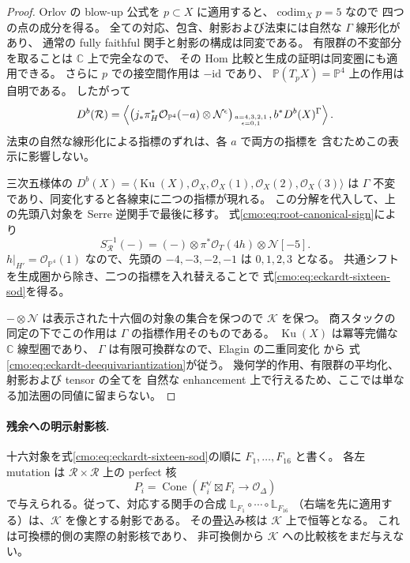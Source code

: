 \begin{proof}
Orlov の blow-up 公式\cite[Theorem~4.3]{CMOOrlovBlowup}を
$p\subset X$ に適用すると、$\operatorname{codim}_Xp=5$ なので
四つの点の成分を得る。
全ての対応、包含、射影および法束には自然な $\Gamma$ 線形化があり、
通常の fully faithful 関手と射影の構成は同変である。
有限群の不変部分を取ることは $\mathbb C$ 上で完全なので、
その Hom 比較と生成の証明は同変圏にも適用できる。
さらに $p$ での接空間作用は $-\mathrm{id}$ であり、
$\mathbb P(T_pX)=\mathbb P^4$ 上の作用は自明である。
したがって
\[
 D^b(\mathcal R)=\left\langle
 \bigl(j_*\pi_H^*\mathcal O_{\mathbb P^4}(-a)
            \otimes\mathcal N^\epsilon\bigr)_{{a=4,3,2,1}\atop{\epsilon=0,1}},
 b^*D^b(X)^\Gamma
 \right\rangle.
\]
法束の自然な線形化による指標のずれは、各 $a$ で両方の指標を
含むためこの表示に影響しない。

三次五様体の
$D^b(X)=\langle\operatorname{Ku}(X),\mathcal O_X,
\mathcal O_X(1),\mathcal O_X(2),\mathcal O_X(3)\rangle$
は $\Gamma$ 不変であり、同変化すると各線束に二つの指標が現れる。
この分解を代入して、上の先頭八対象を Serre 逆関手で最後に移す。
式\eqref{cmo:eq:root-canonical-sign}により
\[
 S_{\mathcal R}^{-1}(-)=(-)\otimes\pi^*\mathcal O_T(4h)
                         \otimes\mathcal N[-5].
\]
$h|_{H'}=\mathcal O_{\mathbb P^4}(1)$ なので、先頭の
$-4,-3,-2,-1$ は $0,1,2,3$ となる。
共通シフトを生成圏から除き、二つの指標を入れ替えることで
式\eqref{cmo:eq:eckardt-sixteen-sod}を得る。

$-\otimes\mathcal N$ は表示された十六個の対象の集合を保つので
$\mathcal K$ を保つ。
商スタックの同定の下でこの作用は $\Gamma$ の指標作用そのものである。
$\operatorname{Ku}(X)$ は冪等完備な $\mathbb C$ 線型圏であり、
$\Gamma$ は有限可換群なので、Elagin の二重同変化
\cite[Theorem~4.2, Section~8]{MEDElagin}から
式\eqref{cmo:eq:eckardt-deequivariantization}が従う。
幾何学的作用、有限群の平均化、射影および tensor の全てを
自然な enhancement 上で行えるため、ここでは単なる加法圏の同値に留まらない。
\end{proof}

\paragraph{残余への明示射影核.}
十六対象を式\eqref{cmo:eq:eckardt-sixteen-sod}の順に
$F_1,\ldots,F_{16}$ と書く。
各左 mutation は $\mathcal R\times\mathcal R$ 上の perfect 核
\[
 P_i=\operatorname{Cone}
 \left(F_i^\vee\boxtimes F_i\longrightarrow\mathcal O_\Delta\right)
\]
で与えられる。従って、対応する関手の合成
$\mathbb L_{F_1}\circ\cdots\circ\mathbb L_{F_{16}}$
（右端を先に適用する）は、$\mathcal K$ を像とする射影である。
その畳込み核は $\mathcal K$ 上で恒等となる。
これは可換標的側の実際の射影核であり、
非可換側から $\mathcal K$ への比較核をまだ与えない。

